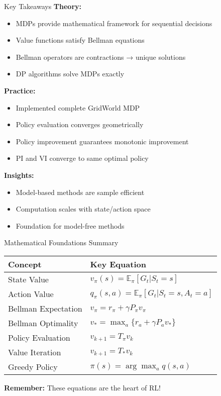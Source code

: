 \documentclass[aspectratio=169,10pt]{beamer}
\begin{document}
\begin{frame}{Key Takeaways}
\textbf{Theory:}
\begin{itemize}
    \item MDPs provide mathematical framework for sequential decisions
    \item Value functions satisfy Bellman equations
    \item Bellman operators are contractions → unique solutions
    \item DP algorithms solve MDPs exactly
\end{itemize}

\textbf{Practice:}
\begin{itemize}
    \item Implemented complete GridWorld MDP
    \item Policy evaluation converges geometrically
    \item Policy improvement guarantees monotonic improvement
    \item PI and VI converge to same optimal policy
\end{itemize}

\textbf{Insights:}
\begin{itemize}
    \item Model-based methods are sample efficient
    \item Computation scales with state/action space
    \item Foundation for model-free methods
\end{itemize}
\end{frame}

\begin{frame}{Mathematical Foundations Summary}
\begin{center}
\begin{tabular}{|l|l|}
\hline
\textbf{Concept} & \textbf{Key Equation} \\
\hline
State Value & $v_\pi(s) = \mathbb{E}_\pi[G_t | S_t = s]$ \\
Action Value & $q_\pi(s,a) = \mathbb{E}_\pi[G_t | S_t = s, A_t = a]$ \\
Bellman Expectation & $v_\pi = r_\pi + \gamma P_\pi v_\pi$ \\
Bellman Optimality & $v_* = \max_a \{r_a + \gamma P_a v_*\}$ \\
Policy Evaluation & $v_{k+1} = T_\pi v_k$ \\
Value Iteration & $v_{k+1} = T_* v_k$ \\
Greedy Policy & $\pi(s) = \arg\max_a q(s,a)$ \\
\hline
\end{tabular}
\end{center}

\textbf{Remember:} These equations are the heart of RL!
\end{frame}
\end{document}
